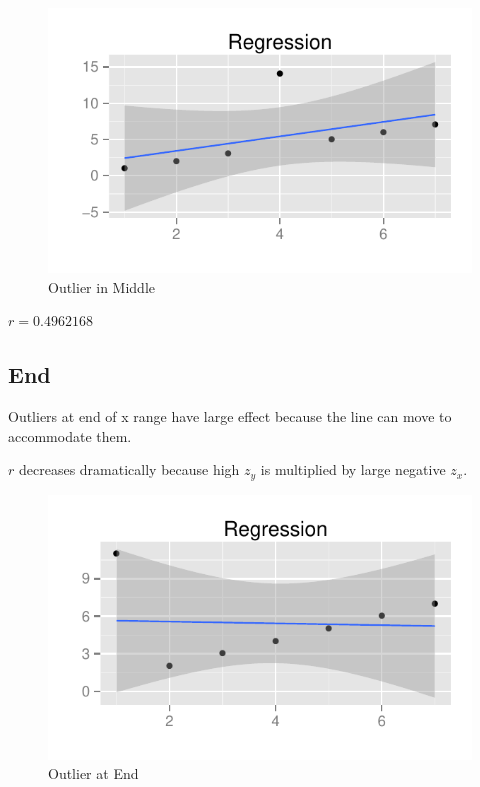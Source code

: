 \documentclass[landscape]{exam}
\begin{document}
  \begin{figure}[H]
    \centering
    \includegraphics{figures/middle_outlier.pdf}
    \caption{Outlier in Middle}
  \end{figure}

  $r = 0.4962168$

  \subsection{End}

  Outliers at end of x range have large effect because the line can move to
  accommodate them.  
  
  $r$ decreases dramatically because high $z_y$ is multiplied by
  large negative $z_x$.

  \begin{figure}[H]
    \centering
    \includegraphics{figures/end_outlier.pdf}
    \caption{Outlier at End}
  \end{figure}
\end{document}

